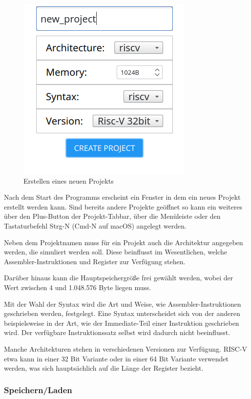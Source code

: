 \begin{figure}[ht]
	\centering
  \includegraphics[scale=1]{Images/create_new_project}
	\caption{Erstellen eines neuen Projekts}
	\label{Project_Creation}
\end{figure}

Nach dem Start des Programms erscheint ein Fenster in dem ein neues Projekt
erstellt werden kann. Sind bereits andere Projekte geöffnet so kann ein weiteres
über den Plus-Button der Projekt-Tabbar, über die Menüleiste oder den
Tastaturbefehl Strg-N (Cmd-N auf macOS) angelegt werden.

Neben dem Projektnamen muss für ein Projekt auch die Architektur angegeben
werden, die simuliert werden soll. Diese beinflusst im Wesentlichen, welche
Assembler-Instruktionen und Register zur Verfügung stehen.

Darüber hinaus kann die Hauptspeichergröße frei gewählt werden, wobei der Wert
zwischen 4 und 1.048.576 Byte liegen muss.

Mit der Wahl der Syntax wird die Art und Weise, wie Assembler-Instruktionen
geschrieben werden, festgelegt. Eine Syntax unterscheidet sich von der anderen
beispielsweise in der Art, wie der Immediate-Teil einer Instruktion geschrieben
wird. Der verfügbare Instruktionssatz selbst wird dadurch nicht beeinflusst.

Manche Architekturen stehen in verschiedenen Versionen zur Verfügung. RISC-V
etwa kann in einer 32 Bit Variante oder in einer 64 Bit Variante verwendet
werden, was sich hauptsächlich auf die Länge der Register bezieht.


\subsubsection{Speichern/Laden}

